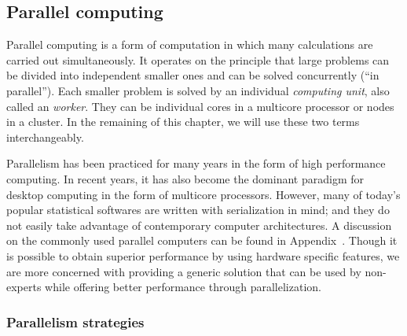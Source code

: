 \subsection{Parallel computing}
\label{sub:Parallel computing}

Parallel computing is a form of computation in which many calculations are carried out simultaneously. It operates on the principle that large problems can be divided into independent smaller ones and can be solved concurrently (``in parallel''). Each smaller problem is solved by an individual \emph{computing unit}, also called an \emph{worker}. They can be individual cores in a multicore processor or nodes in a cluster. In the remaining of this chapter, we will use these two terms interchangeably.

Parallelism has been practiced for many years in the form of high performance computing. In recent years, it has also become the dominant paradigm for desktop computing in the form of multicore processors. However, many of today's popular statistical softwares are written with serialization in mind; and they do not easily take advantage of contemporary computer architectures. A discussion on the commonly used parallel computers can be found in Appendix~. Though it is possible to obtain superior performance by using hardware specific features, we are more concerned with providing a generic solution that can be used by non-experts while offering better performance through parallelization.

\subsubsection{Parallelism strategies}
\label{ssub:Parallelism strategies}

